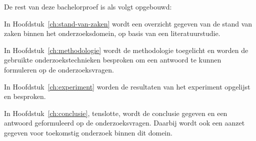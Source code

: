 
De rest van deze bachelorproef is als volgt opgebouwd:

In Hoofdstuk~\ref{ch:stand-van-zaken} wordt een overzicht gegeven van de stand van zaken binnen het onderzoeksdomein, op basis van een literatuurstudie.

In Hoofdstuk~\ref{ch:methodologie} wordt de methodologie toegelicht en worden de gebruikte onderzoekstechnieken besproken om een antwoord te kunnen formuleren op de onderzoeksvragen.

In Hoofdstuk~\ref{ch:experiment} worden de resultaten van het experiment opgelijst en besproken.

In Hoofdstuk~\ref{ch:conclusie}, tenslotte, wordt de conclusie gegeven en een antwoord geformuleerd op de onderzoeksvragen. Daarbij wordt ook een aanzet gegeven voor toekomstig onderzoek binnen dit domein.


